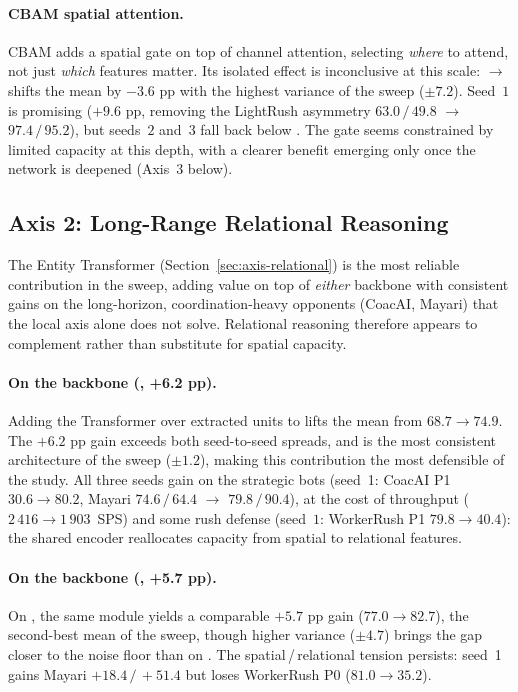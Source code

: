 \paragraph*{CBAM spatial attention.}

CBAM adds a spatial gate on top of channel attention, selecting \emph{where} to attend, not just \emph{which} features matter. Its isolated effect is inconclusive at this scale:  $\to$  shifts the mean by $-3.6$ pp with the highest variance of the sweep ($\pm7.2$). Seed~$1$ is promising ($+9.6$ pp, removing the LightRush asymmetry $63.0\,/\,49.8$ $\to$ $97.4\,/\,95.2$), but seeds~$2$ and~$3$ fall back below . The gate seems constrained by limited capacity at this depth, with a clearer benefit emerging only once the network is deepened (Axis~$3$ below).

\subsection{Axis 2: Long-Range Relational Reasoning}

The Entity Transformer (Section~\ref{sec:axis-relational}) is the most reliable contribution in the sweep, adding value on top of \emph{either} backbone with consistent gains on the long-horizon, coordination-heavy opponents (CoacAI, Mayari) that the local axis alone does not solve. Relational reasoning therefore appears to complement rather than substitute for spatial capacity.

\paragraph*{On the  backbone (, +6.2 pp).}
Adding the Transformer over extracted units to  lifts the mean from $68.7 \to 74.9$. The $+6.2$ pp gain exceeds both seed-to-seed spreads, and  is the most consistent architecture of the sweep ($\pm1.2$), making this contribution the most defensible of the study. All three seeds gain on the strategic bots (seed~1: CoacAI P1 $30.6 \to 80.2$, Mayari $74.6\,/\,64.4$ $\to$ $79.8\,/\,90.4$), at the cost of throughput ($2\,416 \to 1\,903$~SPS) and some rush defense (seed~$1$: WorkerRush P1 $79.8 \to 40.4$): the shared encoder reallocates capacity from spatial to relational features.

\paragraph*{On the  backbone (, +5.7 pp).}
On , the same module yields a comparable $+5.7$ pp gain ($77.0 \to 82.7$), the second-best mean of the sweep, though higher variance ($\pm4.7$) brings the gap closer to the noise floor than on . The spatial\,/\,relational tension persists: seed~1 gains Mayari $+18.4\,/\,+51.4$ but loses WorkerRush P0 ($81.0 \to 35.2$).

